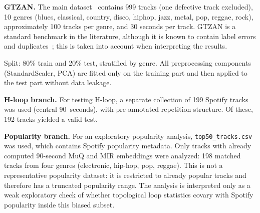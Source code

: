 \textbf{GTZAN.} The main dataset~\cite{tzanetakis2002musical} contains 999 tracks (one defective track excluded), 10 genres (blues, classical, country, disco, hiphop, jazz, metal, pop, reggae, rock), approximately 100 tracks per genre, and 30 seconds per track. GTZAN is a standard benchmark in the literature, although it is known to contain label errors and duplicates~\cite{sturm2013gtzan}; this is taken into account when interpreting the results.

Split: 80\% train and 20\% test, stratified by genre. All preprocessing components (StandardScaler, PCA) are fitted only on the training part and then applied to the test part without data leakage.

\textbf{H-loop branch.} For testing H-loop, a separate collection of 199 Spotify tracks was used (central 90~seconds), with pre-annotated repetition structure. Of these, 192 tracks yielded a valid test.

\textbf{Popularity branch.} For an exploratory popularity analysis, \texttt{top50\_tracks.csv} was used, which contains Spotify popularity metadata. Only tracks with already computed 90-second MuQ and MIR embeddings were analyzed: 198 matched tracks from four genres (electronic, hip-hop, pop, reggae). This is not a representative popularity dataset: it is restricted to already popular tracks and therefore has a truncated popularity range. The analysis is interpreted only as a weak exploratory check of whether topological loop statistics covary with Spotify popularity inside this biased subset.
